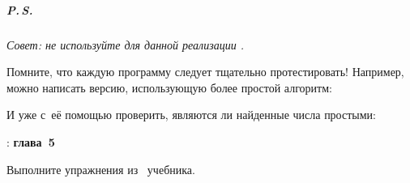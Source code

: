 \subparagraph{P.\,S.}
\emph{Совет: не используйте для данной реализации .}

\noindent Помните, что каждую программу следует тщательно протестировать! Например, можно написать версию, использующую более простой алгоритм:

\noindent И уже с~её помощью проверить, являются ли найденные числа простыми:



\WhatToReadSection
\textcite{Stroustrup:2016:ru}: \textbf{глава~5}


\ExercisesSection
\begin{exercise}
\item Выполните упражнения из~ учебника.

\end{exercise}
